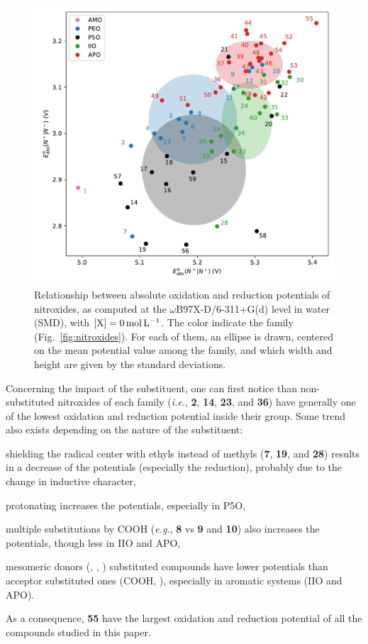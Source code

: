 \documentclass[review]{elsarticle}
\begin{document}
\begin{figure}[!h]
	\centering
	\includegraphics[width=.9\linewidth]{Figure5}
	\caption{Relationship between absolute oxidation and reduction potentials of nitroxides, as computed at the $\omega$B97X-D/6-311+G(d) level in water (SMD), with $[\ce{X}]=\SI{0}{\mole\per\liter}$. The color indicate the family (Fig.~\ref{fig:nitroxides}). For each of them, an ellipse is drawn, centered on the mean potential value among the family, and which width and height are given by the standard deviations.}
	\label{fig:family}
\end{figure}

Concerning the impact of the substituent, one can first notice than non-substituted nitroxides of each family (\textit{i.e.}, \textbf{2}, \textbf{14}, \textbf{23}, and \textbf{36}) have generally one of the lowest oxidation and reduction potential inside their group. Some trend also exists depending on the nature of the substituent: \begin{inparaenum}[(i)]
	\item shielding the radical center with ethyls instead of methyls (\textbf{7}, \textbf{19}, and \textbf{28}) results in a decrease of the potentials (especially the reduction), probably due to the change in inductive character, 
	\item  protonating  increases the potentials, especially in P5O,
	\item multiple substitutions by COOH (\textit{e.g.},  \textbf{8} vs \textbf{9} and \textbf{10}) also increases the potentials, though less in IIO and APO, 
	\item mesomeric donors (, , ) substituted compounds have lower potentials than acceptor substituted ones (COOH, ), especially in aromatic systems (IIO and APO).
\end{inparaenum}
As a consequence, \textbf{55} have the largest oxidation and reduction potential of all the compounds studied in this paper.
\end{document}
